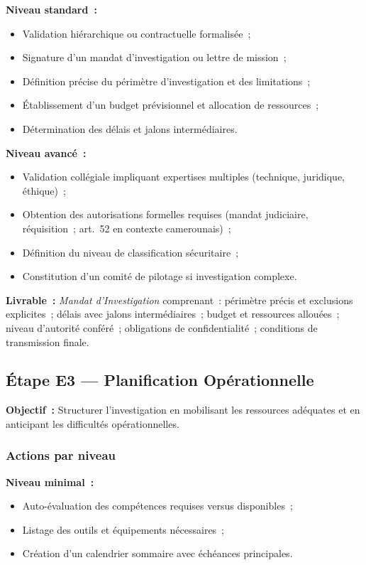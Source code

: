 \textbf{Niveau standard~:}
\begin{itemize}
    \item Validation hiérarchique ou contractuelle formalisée~;
    \item Signature d'un mandat d'investigation ou lettre de mission~;
    \item Définition précise du périmètre d'investigation et des limitations~;
    \item Établissement d'un budget prévisionnel et allocation de ressources~;
    \item Détermination des délais et jalons intermédiaires.
\end{itemize}

\textbf{Niveau avancé~:}
\begin{itemize}
    \item Validation collégiale impliquant expertises multiples (technique,
          juridique, éthique)~;
    \item Obtention des autorisations formelles requises (mandat judiciaire,
          réquisition~; art.~52  en contexte camerounais)~;
    \item Définition du niveau de classification sécuritaire~;
    \item Constitution d'un comité de pilotage si investigation complexe.
\end{itemize}

\textbf{Livrable~:} \textit{Mandat d'Investigation} comprenant~: périmètre précis
et exclusions explicites~; délais avec jalons intermédiaires~; budget et
ressources allouées~; niveau d'autorité conféré~; obligations de confidentialité~;
conditions de transmission finale.

\subsection{Étape E3 --- Planification Opérationnelle}

\textbf{Objectif~:} Structurer l'investigation en mobilisant les ressources
adéquates et en anticipant les difficultés opérationnelles.

\subsubsection*{Actions par niveau}

\textbf{Niveau minimal~:}
\begin{itemize}
    \item Auto-évaluation des compétences requises versus disponibles~;
    \item Listage des outils et équipements nécessaires~;
    \item Création d'un calendrier sommaire avec échéances principales.
\end{itemize}

